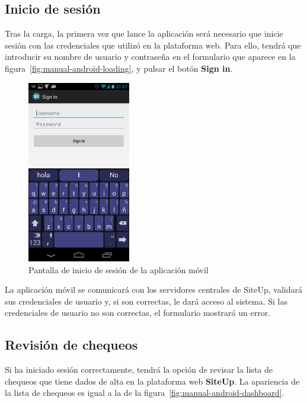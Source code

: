 \subsection{Inicio de sesión}

Tras la carga, la primera vez que lance la aplicación será necesario que inicie
sesión con las credenciales que utilizó en la plataforma web. Para ello, tendrá
que introducir su nombre de usuario y contraseña en el formulario que aparece en
la figura~\ref{fig:manual-android-loading}, y pulsar el botón \textbf{Sign in}.

\begin{figure}[htbp]
  \centering
  \includegraphics[width=0.4\textwidth]{5_diseno/android-3}
  \caption{Pantalla de inicio de sesión de la aplicación móvil}
  \label{fig:manual-android-login}
\end{figure}

La aplicación móvil se comunicará con los servidores centrales de SiteUp,
validará sus credenciales de usuario y, si son correctas, le dará acceso al
sistema. Si las credenciales de usuario no son correctas, el formulario mostrará
un error.

\subsection{Revisión de chequeos}

Si ha iniciado sesión correctamente, tendrá la opción de revisar la lista de
chequeos que tiene dados de alta en la plataforma web \textbf{SiteUp}. La
apariencia de la lista de chequeos es igual a la de la
figura~\ref{fig:manual-android-dashboard}.

